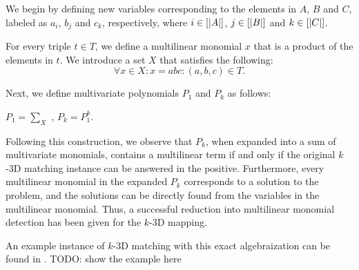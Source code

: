 \begin{problem}
\end{problem}

We begin by defining new variables corresponding to the elements in $A$, $B$ and $C$, 
labeled as $a_i$, $b_j$ and $c_k$, respectively, where $i\in [{\left\vert A\right\vert}]$, $j\in
[{\left\vert B\right\vert}]$ and $k\in [{\left\vert C\right\vert}]$. 

For every triple $t \in T$, we define a multilinear monomial $x$ that is a
product of the elements in $t$. 
We introduce a set $X$ that satisfies the following:
\[
\forall x \in X: x = abc : (a, b, c) \in T.
\]

Next, we define multivariate polynomials $P_1$ and $P_k$ as follows:
\begin{center}$P_1 = \displaystyle \sum_{X}$ ,   $P_k = P_1^k$.\end{center}

Following this construction, we observe that $P_k$, when expanded into a sum of multivariate monomials, 
contains a multilinear term if and only if the original $k$-3D matching instance can be answered in the positive. 
Furthermore, every multilinear monomial in the expanded $P_k$ corresponds to a solution to the problem, and 
the solutions can be directly found from the variables in the multilinear monomial. Thus, 
a successful reduction into multilinear monomial detection has been given for the $k$-3D mapping.

An example instance of $k$-3D matching with this exact algebraization can be found in \cite{KouWil15}. 
TODO: show the example here

